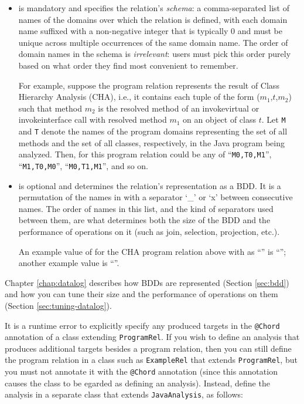 \begin{itemize}

\item

 is mandatory and specifies the relation's {\it schema}: a comma-separated list of names of
the domains over which the relation is defined, with each domain name suffixed with a
non-negative integer that is typically 0 and must be unique across multiple
occurrences of the same domain name.
The order of domain names in the schema is {\it irrelevant}: users must
pick this order purely based on what order they find most convenient to remember.

For example, suppose the program relation represents the result of Class Hierarchy
Analysis (CHA), i.e., it contains each tuple of the form ($m_1$,$t$,$m_2$) such that
method $m_2$ is the resolved method of an invokevirtual or invokeinterface call
with resolved method $m_1$ on an object of class $t$.  Let {\tt M} and {\tt T}
denote the names of the program domains representing the set of all methods
and the set of all classes, respectively, in the Java program being analyzed.
Then,  for this program relation could be any of ``{\tt M0,T0,M1}'',
``{\tt M1,T0,M0}'', ``{\tt M0,T1,M1}'', and so on.

\item

 is optional and determines the relation's representation as a
BDD. It is a permutation of the names in  with a separator
`\_' or `x' between consecutive names.  The order of names in this
list, and the kind of separators used between them, are what determines both
the size of the BDD and the performance of operations on it (such as join,
selection, projection, etc.).

An example value of  for the
CHA program relation above with  as ``''  is
``''; another example value is ``''.
\end{itemize}

Chapter \ref{chap:datalog} describes how BDDs are represented
(Section \ref{sec:bdd}) and how you can tune their size and the
performance of operations on them (Section \ref{sec:tuning-datalog}).

It is a runtime error to explicitly specify any produced targets in the
{\tt @Chord} annotation of a class extending {\tt ProgramRel}.  If you wish to
define an analysis that produces additional targets besides a program relation,
then you can still define the program relation in a class such as
{\tt ExampleRel} that extends {\tt ProgramRel}, but you must not annotate it
with the {\tt @Chord} annotation (since this annotation causes the class to be 
egarded as defining an analysis).  Instead, define the analysis in a separate
class that extends {\tt JavaAnalysis}, as follows:

